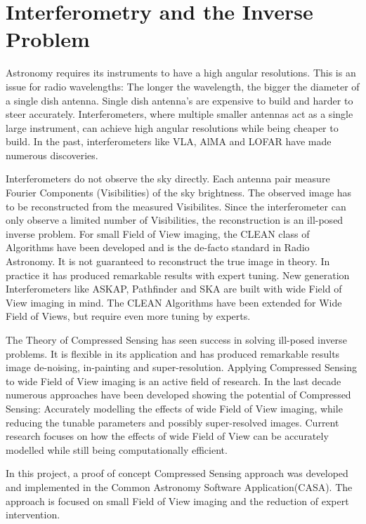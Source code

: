 \section{Interferometry and the Inverse Problem}\label{intro}
Astronomy requires its instruments to have a high angular resolutions. This is an issue for radio wavelengths: The longer the wavelength, the bigger the diameter of a single dish antenna. Single dish antenna's are expensive to build and harder to steer accurately. Interferometers, where multiple smaller antennas act as a single large instrument, can achieve high angular resolutions while being cheaper to build. In the past, interferometers like VLA, AlMA and LOFAR have made numerous discoveries.

Interferometers do not observe the sky directly. Each antenna pair measure Fourier Components (Visibilities) of the sky brightness. The observed image has to be reconstructed from the measured Visibilites. Since the interferometer can only observe a limited number of Visibilities, the reconstruction is an ill-posed inverse problem. For small Field of View imaging, the CLEAN class of Algorithms\cite{hogbom1974aperture}\cite{schwab1984relaxing}\cite{rich2008multi}\cite{rau2011multi} have been developed and is the de-facto standard in Radio Astronomy. It is not guaranteed to reconstruct the true image in theory. In practice it has produced remarkable results with expert tuning. New generation Interferometers like ASKAP, Pathfinder and SKA are built with wide Field of View imaging in mind. The CLEAN Algorithms have been extended for Wide Field of Views, but require even more tuning by experts. 

The Theory of Compressed Sensing\cite{many} has seen success in solving ill-posed inverse problems. It is flexible in its application and has produced remarkable results image de-noising\cite{many}, in-painting\cite{many} and super-resolution\cite{many}. Applying Compressed Sensing to wide Field of View imaging is an active field of research. In the last decade numerous approaches have been developed showing the potential of Compressed Sensing: Accurately modelling the effects of wide Field of View imaging, while reducing the tunable parameters and possibly super-resolved images\cite{many}. Current research focuses on how the effects of wide Field of View can be accurately modelled while still being computationally efficient.

In this project, a proof of concept Compressed Sensing approach was developed and implemented in the Common Astronomy Software Application(CASA). The approach is focused on small Field of View imaging and the reduction of expert intervention.

